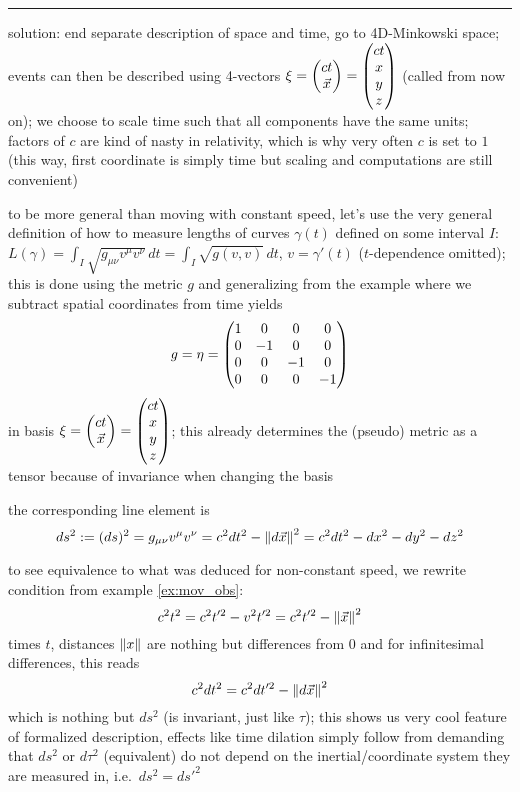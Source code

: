 \hrule


solution: end separate description of space and time, go to 4D-Minkowski space; events can then be described using 4-vectors $\mathbf{\xi} = \mqty(c t \\ \vec{x}) = \mqty(c t \\ x \\ y \\ z)$ (called  from now on); we choose to scale time such that all components have the same units; factors of $c$ are kind of nasty in relativity, which is why very often $c$ is set to $1$ (this way, first coordinate is simply time but scaling and computations are still convenient)



to be more general than moving with constant speed, let's use the very general definition of how to measure lengths of curves $\gamma(t)$ defined on some interval $I$: $L(\gamma) = \int_I \sqrt{g_{\mu \nu} v^\mu v^\nu} \, dt = \int_I \sqrt{g(v, v)} \, dt$, $v = \gamma'(t)$ ($t$-dependence omitted); this is done using the metric $g$ and generalizing from the example where we subtract spatial coordinates from time yields
\begin{equation}
g = \eta = \mqty(1 & 0 & 0 & 0 \\ 0 & -1 & 0 & 0 \\ 0 & 0 & -1 & 0 \\ 0 & 0 & 0 & -1)
\end{equation}
in basis $\mathbf{\xi} = \mqty(c t \\ \vec{x}) = \mqty(c t \\ x \\ y \\ z)$; this already determines the (pseudo) metric as a tensor because of invariance when changing the basis

the corresponding line element is
\begin{equation}
ds^2 := (ds)^2 = g_{\mu \nu} v^\mu v^\nu = c^2 dt^2 - \norm{d\vec{x}}^2 = c^2 dt^2 - dx^2 - dy^2 - dz^2
\end{equation}


to see equivalence to what was deduced for non-constant speed, we rewrite condition from example \ref{ex:mov_obs}:
\begin{equation*}
c^2 t^2 = c^2 t'^2 - v^2 t'^2 = c^2 t'^2 - \norm{\vec{x}}^2
\end{equation*}
times $t$, distances $\norm{x}$ are nothing but differences from $0$ and for infinitesimal differences, this reads
\begin{equation*}
c^2 dt^2 = c^2 dt'^2 - \norm{d\vec{x}}^2
\end{equation*}
which is nothing but $ds^2$ (is invariant, just like $\tau$); this shows us very cool feature of formalized description, effects like time dilation simply follow from demanding that $ds^2$ or $d\tau^2$ (equivalent) do not depend on the inertial/coordinate system they are measured in, i.e.~$ds^2 = ds'^2$




